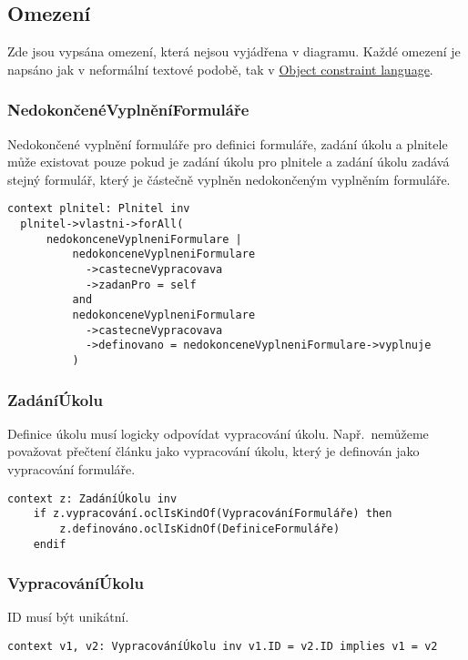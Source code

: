 \subsection{Omezení}\label{subsec:omezeni}

Zde jsou vypsána omezení, která nejsou vyjádřena v diagramu.
Každé omezení je napsáno jak v neformální textové podobě, tak v \href{https://www.omg.org/spec/OCL/2.4/About-OCL}{Object constraint language}.

\subsubsection{NedokončenéVyplněníFormuláře}

Nedokončené vyplnění formuláře pro definici formuláře, zadání úkolu a plnitele může existovat pouze pokud je zadání úkolu pro plnitele a zadání úkolu zadává stejný formulář, který je částečně vyplněn nedokončeným vyplněním formuláře.

\begin{verbatim}
context plnitel: Plnitel inv
  plnitel->vlastni->forAll(
      nedokonceneVyplneniFormulare |
          nedokonceneVyplneniFormulare
            ->castecneVypracovava
            ->zadanPro = self
          and
          nedokonceneVyplneniFormulare
            ->castecneVypracovava
            ->definovano = nedokonceneVyplneniFormulare->vyplnuje
          )
\end{verbatim}

\subsubsection{ZadáníÚkolu}

Definice úkolu musí logicky odpovídat vypracování úkolu.
Např.\ nemůžeme považovat přečtení článku jako vypracování úkolu, který je definován jako vypracování formuláře.

\begin{verbatim}
context z: ZadáníÚkolu inv
    if z.vypracování.oclIsKindOf(VypracováníFormuláře) then
        z.definováno.oclIsKidnOf(DefiniceFormuláře)
    endif
\end{verbatim}

\subsubsection{VypracováníÚkolu}

ID musí být unikátní.

\begin{verbatim}
context v1, v2: VypracováníÚkolu inv v1.ID = v2.ID implies v1 = v2
\end{verbatim}


